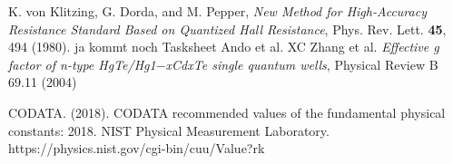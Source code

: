 \begin{thebibliography}{99}
     K. von Klitzing, G. Dorda, and M. Pepper, \emph{New Method for High-Accuracy
    Resistance Standard Based on Quantized Hall Resistance}, Phys. Rev. Lett. \textbf{45}, 494 (1980).
     ja kommt noch
     Tasksheet
     Ando et al.
     XC Zhang et al. \emph{Effective g factor of n-type HgTe/Hg1$−$xCdxTe single quantum wells}, 
                    Physical Review B 69.11 (2004)

    CODATA. (2018). CODATA recommended values of the fundamental physical constants: 
    2018. NIST Physical Measurement Laboratory.
    https://physics.nist.gov/cgi-bin/cuu/Value?rk



\end{thebibliography}



